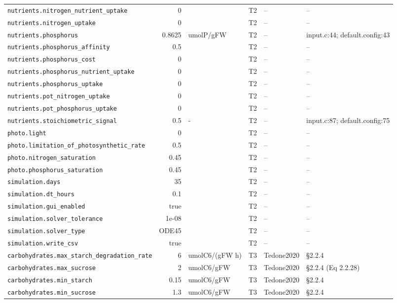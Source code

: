 \begin{table}[!htbp]
\begin{tabular}{@{}p{52mm}rp{20mm}cp{20mm}p{38mm}@{}}
\texttt{nutrients.nitrogen\_nutrient\_uptake} & 0 &  & T2 & -- & -- \\
\texttt{nutrients.nitrogen\_uptake} & 0 &  & T2 & -- & -- \\
\texttt{nutrients.phosphorus} & 0.8625 & umolP/gFW & T2 & -- & input.c:44; default.config:43 \\
\texttt{nutrients.phosphorus\_affinity} & 0.5 &  & T2 & -- & -- \\
\texttt{nutrients.phosphorus\_cost} & 0 &  & T2 & -- & -- \\
\texttt{nutrients.phosphorus\_nutrient\_uptake} & 0 &  & T2 & -- & -- \\
\texttt{nutrients.phosphorus\_uptake} & 0 &  & T2 & -- & -- \\
\texttt{nutrients.pot\_nitrogen\_uptake} & 0 &  & T2 & -- & -- \\
\texttt{nutrients.pot\_phosphorus\_uptake} & 0 &  & T2 & -- & -- \\
\texttt{nutrients.stoichiometric\_signal} & 0.5 & - & T2 & -- & input.c:87; default.config:75 \\
\texttt{photo.light} & 0 &  & T2 & -- & -- \\
\texttt{photo.limitation\_of\_photosynthetic\_rate} & 0.5 &  & T2 & -- & -- \\
\texttt{photo.nitrogen\_saturation} & 0.45 &  & T2 & -- & -- \\
\texttt{photo.phosphorus\_saturation} & 0.45 &  & T2 & -- & -- \\
\texttt{simulation.days} & 35 &  & T2 & -- & -- \\
\texttt{simulation.dt\_hours} & 0.1 &  & T2 & -- & -- \\
\texttt{simulation.gui\_enabled} & true &  & T2 & -- & -- \\
\texttt{simulation.solver\_tolerance} & 1e-08 &  & T2 & -- & -- \\
\texttt{simulation.solver\_type} & ODE45 &  & T2 & -- & -- \\
\texttt{simulation.write\_csv} & true &  & T2 & -- & -- \\
\texttt{carbohydrates.max\_starch\_degradation\_rate} & 6 & umolC6/(gFW h) & T3 & Tedone2020 & \S 2.2.4 \\
\texttt{carbohydrates.max\_sucrose} & 2 & umolC6/gFW & T3 & Tedone2020 & \S 2.2.4 (Eq 2.2.28) \\
\texttt{carbohydrates.min\_starch} & 0.15 & umolC6/gFW & T3 & Tedone2020 & \S 2.2.4 \\
\texttt{carbohydrates.min\_sucrose} & 1.3 & umolC6/gFW & T3 & Tedone2020 & \S 2.2.4 \\

\end{tabular}
\end{table}
